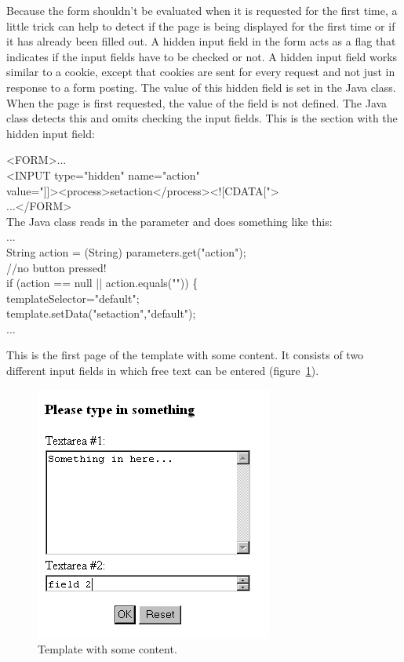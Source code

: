 Because the form shouldn't be evaluated when it is requested for the
first time, a little trick can help to detect if the page is being
displayed for the first time or if it has already been filled out. A
hidden input field in the form acts as a flag that indicates if the
input fields have to be checked or not. A hidden input field works
similar to a cookie, except that cookies are sent for every request and
not just in response to a form posting. The value of this hidden field
is set in the Java class. When the page is first requested, the value of
the field is not defined. The Java class detects this and omits checking
the input fields. This is the section with the hidden input field:

\begin{java}
<FORM>...\\
<INPUT type="hidden" name="action"\\
value="]]><process>setaction</process><![CDATA[">\\
...</FORM>\\
The Java class reads in the parameter and does something like this:\\
...\\
String action = (String) parameters.get("action");\\
//no button pressed!\\
if (action == null || action.equals("")) \{\\
\jtabc        templateSelector="default";\\
\jtabc        template.setData("setaction","default");\\
...\\
\end{java}

This is the first page of the template with some content. It consists of
two different input fields in which free text can be entered (figure~\ref{FreeText}).

\begin{figure}
\begin{center}
\includegraphics[clip,width=0.4\linewidth]{pics/modules/38}
\end{center}
\caption[Template with some content.]{Template with some content.}
\label{FreeText}
\end{figure}

